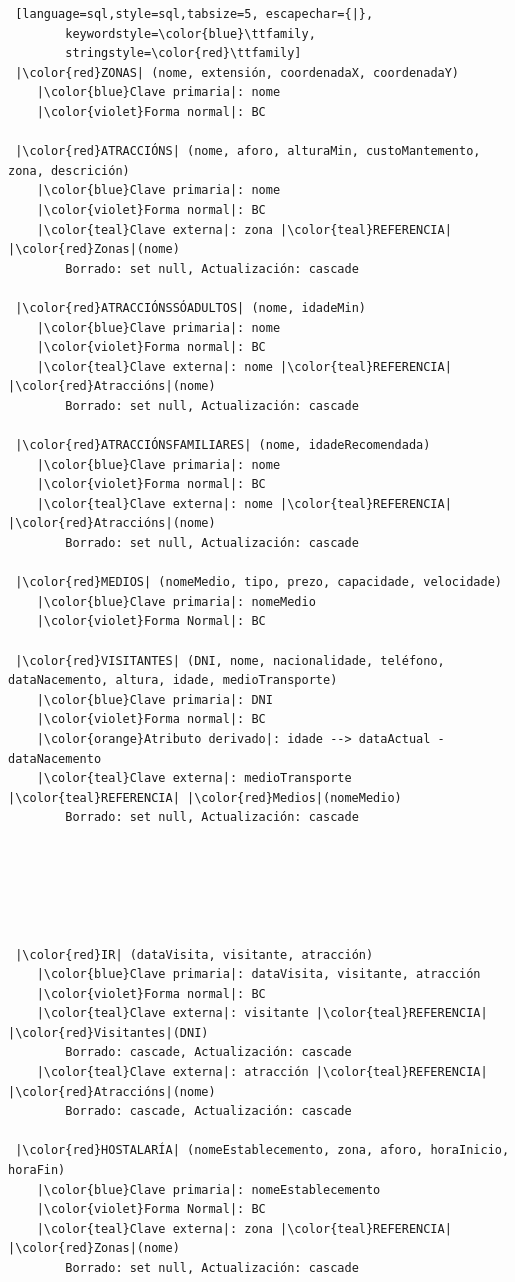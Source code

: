 \documentclass[12pt,a4paper]{book}
\theoremstyle{definition}
\theoremstyle{break}
\begin{document}
	\begin{lstlisting} [language=sql,style=sql,tabsize=5, escapechar={|},
		keywordstyle=\color{blue}\ttfamily,
		stringstyle=\color{red}\ttfamily]
 |\color{red}ZONAS| (nome, extensión, coordenadaX, coordenadaY)
	|\color{blue}Clave primaria|: nome
	|\color{violet}Forma normal|: BC
	
 |\color{red}ATRACCIÓNS| (nome, aforo, alturaMin, custoMantemento, zona, descrición)
 	|\color{blue}Clave primaria|: nome
 	|\color{violet}Forma normal|: BC
 	|\color{teal}Clave externa|: zona |\color{teal}REFERENCIA| |\color{red}Zonas|(nome)
 		Borrado: set null, Actualización: cascade
		
 |\color{red}ATRACCIÓNSSÓADULTOS| (nome, idadeMin)
	|\color{blue}Clave primaria|: nome
	|\color{violet}Forma normal|: BC
	|\color{teal}Clave externa|: nome |\color{teal}REFERENCIA| |\color{red}Atraccións|(nome)
		Borrado: set null, Actualización: cascade
		
 |\color{red}ATRACCIÓNSFAMILIARES| (nome, idadeRecomendada)
	|\color{blue}Clave primaria|: nome
	|\color{violet}Forma normal|: BC
	|\color{teal}Clave externa|: nome |\color{teal}REFERENCIA| |\color{red}Atraccións|(nome)
		Borrado: set null, Actualización: cascade
		
 |\color{red}MEDIOS| (nomeMedio, tipo, prezo, capacidade, velocidade)
	|\color{blue}Clave primaria|: nomeMedio
	|\color{violet}Forma Normal|: BC
		
 |\color{red}VISITANTES| (DNI, nome, nacionalidade, teléfono, dataNacemento, altura, idade, medioTransporte) 
	|\color{blue}Clave primaria|: DNI
	|\color{violet}Forma normal|: BC
	|\color{orange}Atributo derivado|: idade --> dataActual - dataNacemento
	|\color{teal}Clave externa|: medioTransporte |\color{teal}REFERENCIA| |\color{red}Medios|(nomeMedio)
		Borrado: set null, Actualización: cascade
		
		
		
		
		
		
 |\color{red}IR| (dataVisita, visitante, atracción)
	|\color{blue}Clave primaria|: dataVisita, visitante, atracción
	|\color{violet}Forma normal|: BC
	|\color{teal}Clave externa|: visitante |\color{teal}REFERENCIA| |\color{red}Visitantes|(DNI)
		Borrado: cascade, Actualización: cascade
	|\color{teal}Clave externa|: atracción |\color{teal}REFERENCIA| |\color{red}Atraccións|(nome)
		Borrado: cascade, Actualización: cascade
		
 |\color{red}HOSTALARÍA| (nomeEstablecemento, zona, aforo, horaInicio, horaFin)
	|\color{blue}Clave primaria|: nomeEstablecemento
	|\color{violet}Forma Normal|: BC
	|\color{teal}Clave externa|: zona |\color{teal}REFERENCIA| |\color{red}Zonas|(nome)
		Borrado: set null, Actualización: cascade
		

\end{lstlisting}
\end{document}
